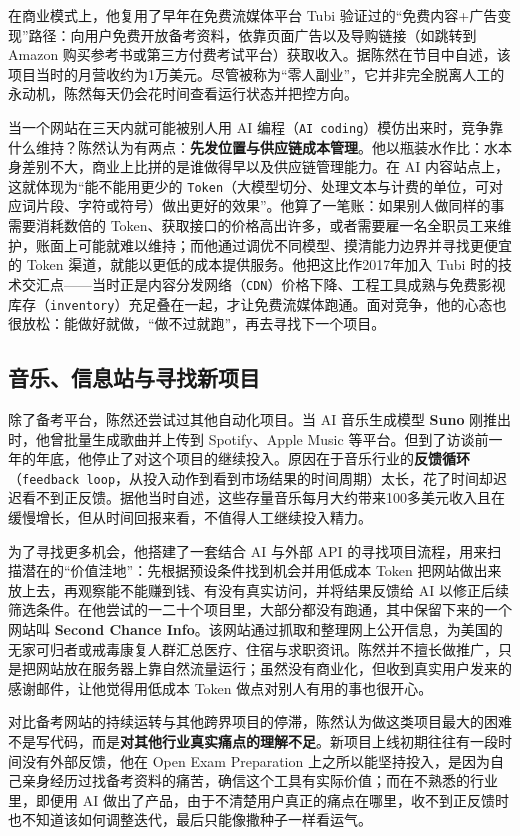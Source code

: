 \documentclass[UTF8,a4paper,11pt,fontset=fandol]{ctexart}
\begin{document}
在商业模式上，他复用了早年在免费流媒体平台 Tubi 验证过的“免费内容+广告变现”路径：向用户免费开放备考资料，依靠页面广告以及导购链接（如跳转到 Amazon 购买参考书或第三方付费考试平台）获取收入。据陈然在节目中自述，该项目当时的月营收约为1万美元。尽管被称为“零人副业”，它并非完全脱离人工的永动机，陈然每天仍会花时间查看运行状态并把控方向。

当一个网站在三天内就可能被别人用 AI 编程（\texttt{AI coding}）模仿出来时，竞争靠什么维持？陈然认为有两点：\textbf{先发位置与供应链成本管理}。他以瓶装水作比：水本身差别不大，商业上比拼的是谁做得早以及供应链管理能力。在 AI 内容站点上，这就体现为“能不能用更少的 \texttt{Token}（大模型切分、处理文本与计费的单位，可对应词片段、字符或符号）做出更好的效果”。他算了一笔账：如果别人做同样的事需要消耗数倍的 Token、获取接口的价格高出许多，或者需要雇一名全职员工来维护，账面上可能就难以维持；而他通过调优不同模型、摸清能力边界并寻找更便宜的 Token 渠道，就能以更低的成本提供服务。他把这比作2017年加入 Tubi 时的技术交汇点——当时正是内容分发网络（\texttt{CDN}）价格下降、工程工具成熟与免费影视库存（\texttt{inventory}）充足叠在一起，才让免费流媒体跑通。面对竞争，他的心态也很放松：能做好就做，“做不过就跑”，再去寻找下一个项目。

\subsection{音乐、信息站与寻找新项目}
除了备考平台，陈然还尝试过其他自动化项目。当 AI 音乐生成模型 \textbf{Suno} 刚推出时，他曾批量生成歌曲并上传到 Spotify、Apple Music 等平台。但到了访谈前一年的年底，他停止了对这个项目的继续投入。原因在于音乐行业的\textbf{反馈循环}（\texttt{feedback loop}，从投入动作到看到市场结果的时间周期）太长，花了时间却迟迟看不到正反馈。据他当时自述，这些存量音乐每月大约带来100多美元收入且在缓慢增长，但从时间回报来看，不值得人工继续投入精力。

为了寻找更多机会，他搭建了一套结合 AI 与外部 API 的寻找项目流程，用来扫描潜在的“价值洼地”：先根据预设条件找到机会并用低成本 Token 把网站做出来放上去，再观察能不能赚到钱、有没有真实访问，并将结果反馈给 AI 以修正后续筛选条件。在他尝试的一二十个项目里，大部分都没有跑通，其中保留下来的一个网站叫 \textbf{Second Chance Info}。该网站通过抓取和整理网上公开信息，为美国的无家可归者或戒毒康复人群汇总医疗、住宿与求职资讯。陈然并不擅长做推广，只是把网站放在服务器上靠自然流量运行；虽然没有商业化，但收到真实用户发来的感谢邮件，让他觉得用低成本 Token 做点对别人有用的事也很开心。

对比备考网站的持续运转与其他跨界项目的停滞，陈然认为做这类项目最大的困难不是写代码，而是\textbf{对其他行业真实痛点的理解不足}。新项目上线初期往往有一段时间没有外部反馈，他在 Open Exam Preparation 上之所以能坚持投入，是因为自己亲身经历过找备考资料的痛苦，确信这个工具有实际价值；而在不熟悉的行业里，即便用 AI 做出了产品，由于不清楚用户真正的痛点在哪里，收不到正反馈时也不知道该如何调整迭代，最后只能像撒种子一样看运气。
\end{document}

